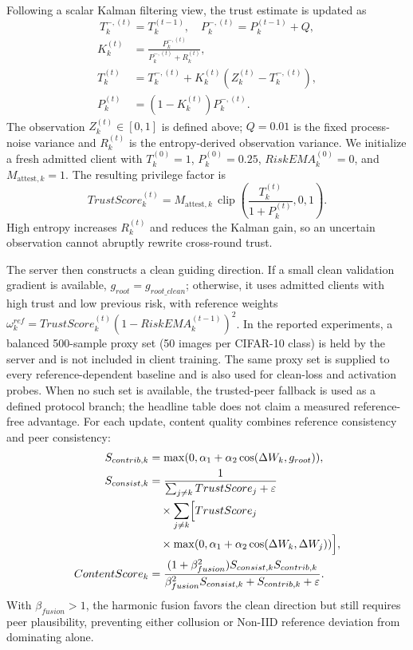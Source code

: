 \documentclass[conference,compsoc]{IEEEtran}
\begin{document}
Following a scalar Kalman filtering view, the trust estimate is updated as
\begin{equation}
    T_{k}^{-,(t)}=T_k^{(t-1)},\quad P_{k}^{-,(t)}=P_k^{(t-1)}+Q,
\end{equation}
\begin{equation}
\begin{aligned}
    K_k^{(t)}&=\frac{P_k^{-,(t)}}{P_k^{-,(t)}+R_k^{(t)}},\\
    T_k^{(t)}&=T_k^{-,(t)}+K_k^{(t)}(Z_k^{(t)}-T_k^{-,(t)}),\\
    P_k^{(t)}&=(1-K_k^{(t)})P_k^{-,(t)}.
\end{aligned}
\end{equation}
The observation $Z_k^{(t)}\in[0,1]$ is defined above; $Q=0.01$ is the fixed process-noise variance and $R_k^{(t)}$ is the entropy-derived observation variance. We initialize a fresh admitted client with $T_k^{(0)}=1$, $P_k^{(0)}=0.25$, $RiskEMA_k^{(0)}=0$, and $M_{\text{attest},k}=1$. The resulting privilege factor is
\begin{equation}
    TrustScore_k^{(t)}=M_{\text{attest},k}\,\operatorname{clip}\!\left(\frac{T_k^{(t)}}{1+P_k^{(t)}},0,1\right).
\end{equation}
High entropy increases $R_k^{(t)}$ and reduces the Kalman gain, so an uncertain observation cannot abruptly rewrite cross-round trust.

    The server then constructs a clean guiding direction. If a small clean validation gradient is available, $g_{root}=g_{root\_clean}$; otherwise, it uses admitted clients with high trust and low previous risk, with reference weights $\omega_k^{ref}=TrustScore_k^{(t)}(1-RiskEMA_k^{(t-1)})^2$. In the reported experiments, a balanced 500-sample proxy set (50 images per CIFAR-10 class) is held by the server and is not included in client training. The same proxy set is supplied to every reference-dependent baseline and is also used for clean-loss and activation probes. When no such set is available, the trusted-peer fallback is used as a defined protocol branch; the headline table does not claim a measured reference-free advantage. For each update, content quality combines reference consistency and peer consistency:
\begin{align}
    S_{contrib,k}  & =\max(0,\alpha_1+\alpha_2\cos(\Delta W_k,g_{root})),                                  \\
    S_{consist,k} &=\frac{1}{\sum_{j\ne k}TrustScore_j+\varepsilon}\nonumber\\
    &\quad\times\sum_{j\ne k}\Bigl[TrustScore_j\nonumber\\
    &\quad\times\max(0,\alpha_1+\alpha_2\cos(\Delta W_k,\Delta W_j))\Bigr],                                                               \\
    ContentScore_k & =\frac{(1+\beta_{fusion}^2)S_{consist,k}S_{contrib,k}}
    {\beta_{fusion}^2S_{consist,k}+S_{contrib,k}+\varepsilon}.
\end{align}
With $\beta_{fusion}>1$, the harmonic fusion favors the clean direction but still requires peer plausibility, preventing either collusion or Non-IID reference deviation from dominating alone.
\end{document}
